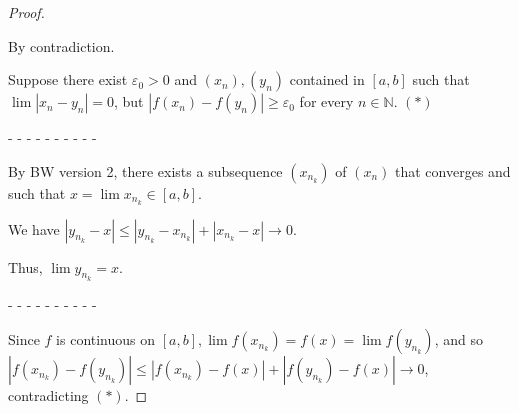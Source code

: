 \documentclass[12pt]{article}
\newcommand{\NN}{\mathbb{N}}
\newcommand\abs[1]{\left| #1 \right|} %
\newcommand{\eps}{\varepsilon}
\begin{document}
\begin{proof}
$ $

By contradiction.

Suppose there exist $\eps_0 > 0$ and $(x_n), (y_n)$ contained in $[a, b]$ such that
\\
$\lim \abs{x_n - y_n} = 0$, but $\abs{f(x_n) - f(y_n)} \ge \eps_0$ for every $n \in \NN$. $(\ast)$

- - - - - - - - - -

By BW version 2, there exists a subsequence $(x_{n_k})$ of $(x_n)$ that converges and such that $x = \lim x_{n_k} \in [a, b]$.

We have $\abs{y_{n_k} - x} \le \abs{y_{n_k} - x_{n_k}} + \abs{x_{n_k} - x} \rightarrow 0$.

Thus, $\lim y_{n_k} = x$.

- - - - - - - - - -

Since $f$ is continuous on $[a, b], \lim f(x_{n_k}) = f(x) = \lim f(y_{n_k})$, and so
\\
$\abs{f(x_{n_k}) - f(y_{n_k})} \le \abs{f(x_{n_k}) - f(x)} + \abs{f(y_{n_k}) - f(x)} \rightarrow 0$, contradicting $(\ast)$.
\end{proof}
\end{document}
